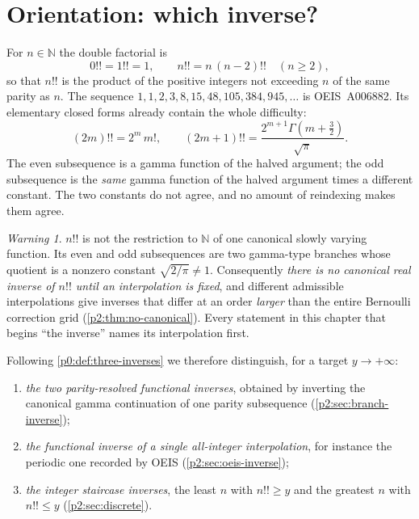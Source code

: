 \documentclass[11pt,a4paper,oneside]{book}
\theoremstyle{plain}
\theoremstyle{definition}
\theoremstyle{remark}
\newtheorem{warning}[theorem]{Warning}
\newcommand{\Nat}{\mathbb{N}}
\begin{document}
\section{Orientation: which inverse?}
\label{p2:sec:orientation}

For \(n\in\Nat\) the double factorial is
\begin{equation}
 0!!=1!!=1,\qquad n!!=n\,(n-2)!!\quad(n\ge2),
 \label{p2:eq:dfac-recurrence}
\end{equation}
so that \(n!!\) is the product of the positive integers not exceeding \(n\)
of the same parity as \(n\).  The sequence
\(1,1,2,3,8,15,48,105,384,945,\dots\) is OEIS~A006882.  Its elementary closed
forms already contain the whole difficulty:
\begin{equation}
 (2m)!!=2^m\,m!,
 \qquad
 (2m+1)!!=\frac{2^{m+1}\Gamma\!\left(m+\tfrac32\right)}{\sqrt\pi}.
 \label{p2:eq:parity-closed}
\end{equation}
The even subsequence is a gamma function of the halved argument; the odd
subsequence is the \emph{same} gamma function of the halved argument times a
different constant.  The two constants do not agree, and no amount of
reindexing makes them agree.

\begin{warning}
\label{p2:rem:spine}
\(n!!\) is not the restriction to \(\Nat\) of one canonical slowly varying
function.  Its even and odd subsequences are two gamma-type branches whose
quotient is a nonzero constant \(\sqrt{2/\pi}\ne1\).  Consequently
\emph{there is no canonical real inverse of \(n!!\) until an interpolation
is fixed}, and different admissible interpolations give inverses that differ
at an order \emph{larger} than the entire Bernoulli correction grid
(\cref{p2:thm:no-canonical}).  Every statement in this chapter that begins
``the inverse'' names its interpolation first.
\end{warning}

Following \cref{p0:def:three-inverses} we therefore distinguish, for a target
\(y\to+\infty\):

\begin{enumerate}[label=\textup{(\roman*)}]
\item \emph{the two parity-resolved functional inverses}, obtained by inverting
      the canonical gamma continuation of one parity subsequence
      (\cref{p2:sec:branch-inverse});
\item \emph{the functional inverse of a single all-integer interpolation},
      for instance the periodic one recorded by OEIS
      (\cref{p2:sec:oeis-inverse});
\item \emph{the integer staircase inverses}, the least \(n\) with \(n!!\ge y\)
      and the greatest \(n\) with \(n!!\le y\) (\cref{p2:sec:discrete}).
\end{enumerate}
\end{document}

